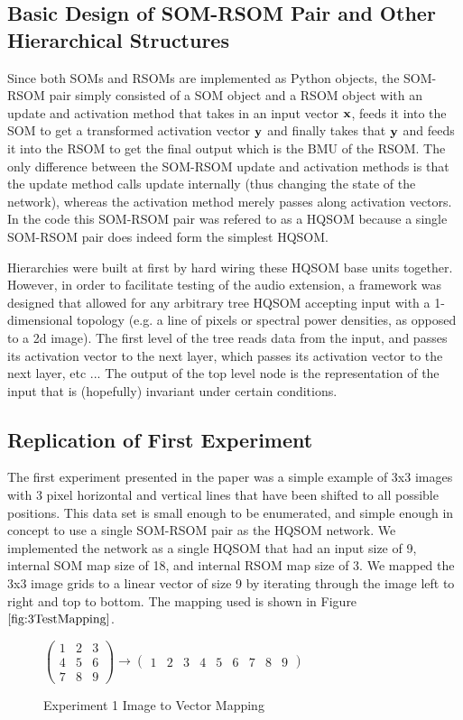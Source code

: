 \documentclass[a4paper,10pt]{article}
\begin{document}
\subsection{Basic Design of SOM-RSOM Pair and Other Hierarchical Structures}
Since both SOMs and RSOMs are implemented as Python objects, the SOM-RSOM pair simply consisted of
a SOM object and a RSOM object with an update and activation method that takes in an input vector
$\bold{x}$, feeds it into the SOM to get a transformed activation vector $\bold{y}$ and finally
takes that $\bold{y}$ and feeds it into the RSOM to get the final output which is the BMU of the
RSOM.  The only difference between the SOM-RSOM update and activation methods is that the update
method calls update internally (thus changing the state of the network), whereas the activation
method merely passes along activation
vectors. In the code this SOM-RSOM pair was refered to as a HQSOM because a single SOM-RSOM pair
does indeed form the simplest HQSOM.

Hierarchies were built at first by hard wiring these HQSOM base units together.  However, in order
to facilitate testing of the audio extension, a framework was designed that allowed for any
arbitrary tree HQSOM accepting input with a 1-dimensional topology (e.g. a line of pixels or
spectral power densities, as opposed to a 2d image).  The first level of the tree reads data from
the input, and passes its activation vector to the next layer, which passes its activation vector to
the next layer, etc ...  The output of the top level node is the representation of the input that is
(hopefully) invariant under certain conditions.

\subsection{Replication of First Experiment}
The first experiment presented in the paper was a simple example of 3x3 images with 3
pixel horizontal and vertical lines that have been shifted to all possible positions.  This data
set is small enough to be enumerated, and simple enough in concept to use a single SOM-RSOM pair as
the HQSOM network.  We implemented the network as a single HQSOM that had an input size of 9,
internal SOM map size of 18, and internal RSOM map size of 3.  We mapped the 3x3 image grids
to a linear vector of size 9 by iterating through the image left to right and top to bottom.
The mapping used is shown in Figure $\ref{fig:3TestMapping}$.
\begin{figure}[ht]
\begin{center} 
$\begin{pmatrix}
1 & 2 & 3 \\
4 & 5 & 6 \\
7 & 8 & 9 
\end{pmatrix}
\rightarrow
\begin{pmatrix}
1 & 2 & 3 & 4 & 5 & 6 & 7 & 8 & 9 
\end{pmatrix}
$
\end{center} 
\caption{Experiment 1 Image to Vector Mapping}
\label{fig:3TestMapping}
\end{figure} 
\end{document}
